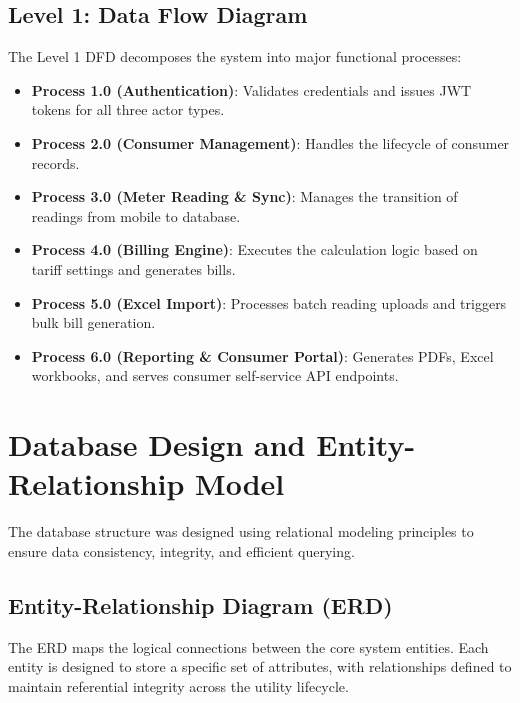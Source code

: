 \documentclass[12pt, a4paper, onecolumn]{report}
\begin{document}
\subsection{Level 1: Data Flow Diagram}
The Level 1 DFD decomposes the system into major functional processes:
\begin{itemize}
    \item \textbf{Process 1.0 (Authentication)}: Validates credentials and issues JWT tokens for all three actor types.
    \item \textbf{Process 2.0 (Consumer Management)}: Handles the lifecycle of consumer records.
    \item \textbf{Process 3.0 (Meter Reading \& Sync)}: Manages the transition of readings from mobile to database.
    \item \textbf{Process 4.0 (Billing Engine)}: Executes the calculation logic based on tariff settings and generates bills.
    \item \textbf{Process 5.0 (Excel Import)}: Processes batch reading uploads and triggers bulk bill generation.
    \item \textbf{Process 6.0 (Reporting \& Consumer Portal)}: Generates PDFs, Excel workbooks, and serves consumer self-service API endpoints.
\end{itemize}




\section{Database Design and Entity-Relationship Model}

The database structure was designed using relational modeling principles to ensure data consistency, integrity, and efficient querying.


\subsection{Entity-Relationship Diagram (ERD)}
The ERD maps the logical connections between the core system entities. Each entity is designed to store a specific set of attributes, with relationships defined to maintain referential integrity across the utility lifecycle.
\end{document}
